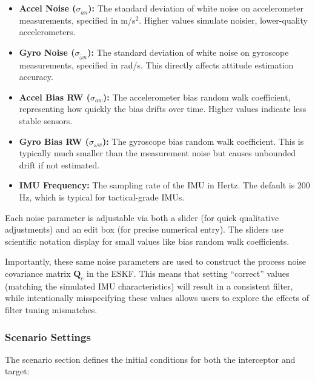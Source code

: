 \documentclass[11pt,a4paper]{article}
\begin{document}
\begin{itemize}
    \item \textbf{Accel Noise ($\sigma_{\tilde{a}n}$):} The standard deviation of white noise on accelerometer measurements, specified in m/s$^2$. Higher values simulate noisier, lower-quality accelerometers.
    
    \item \textbf{Gyro Noise ($\sigma_{\tilde{\omega}n}$):} The standard deviation of white noise on gyroscope measurements, specified in rad/s. This directly affects attitude estimation accuracy.
    
    \item \textbf{Accel Bias RW ($\sigma_{aw}$):} The accelerometer bias random walk coefficient, representing how quickly the bias drifts over time. Higher values indicate less stable sensors.
    
    \item \textbf{Gyro Bias RW ($\sigma_{\omega w}$):} The gyroscope bias random walk coefficient. This is typically much smaller than the measurement noise but causes unbounded drift if not estimated.
    
    \item \textbf{IMU Frequency:} The sampling rate of the IMU in Hertz. The default is 200 Hz, which is typical for tactical-grade IMUs.
\end{itemize}

Each noise parameter is adjustable via both a slider (for quick qualitative adjustments) and an edit box (for precise numerical entry). The sliders use scientific notation display for small values like bias random walk coefficients.

Importantly, these same noise parameters are used to construct the process noise covariance matrix $\mathbf{Q}_c$ in the ESKF. This means that setting ``correct'' values (matching the simulated IMU characteristics) will result in a consistent filter, while intentionally misspecifying these values allows users to explore the effects of filter tuning mismatches.

\subsubsection{Scenario Settings}
The scenario section defines the initial conditions for both the interceptor and target:
\end{document}
